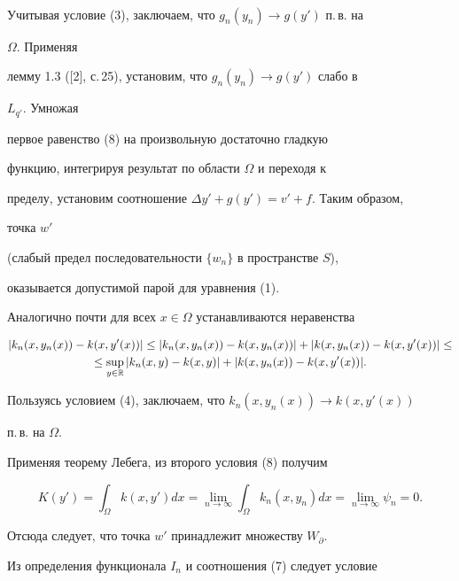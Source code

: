 \begin{pf}
\begin{gather*}
\end{gather*} 


Учитывая условие (3), заключаем, что $g_n(y_n)\to g(y')$ п.\,в. на 


$\Omega$. Применяя 


лемму 1.3 ([2], с.\,25), установим, что $g_n(y_n)\to g(y')$ слабо в 


$L_{q'}$. Умножая 


первое равенство (8) на произвольную достаточно гладкую 


функцию, интегрируя результат по области $\Omega$ и переходя к 


пределу, установим соотношение $\Delta y'+g(y')=v'+f$. Таким образом, 


точка $w'$ 


(слабый предел последовательности $\{w_n\}$ в пространстве $S$), 


оказывается допустимой парой для уравнения (1). 


 


Аналогично почти для всех $x\in\Omega$ устанавливаются неравенства 


\begin{gather*} 


|k_n(x,y_n(x))-k(x,y'(x))|\le|k_n(x,y_n(x))-k(x,y_n(x))|+ 


|k(x,y_n(x))-k(x,y'(x))|\le \\ 


% 


\le\sup_{y\in\Bbb R}|k_n(x,y)-k(x,y)|+ 


|k(x,y_n(x))-k(x,y'(x))|. 


\end{gather*} 


Пользуясь условием (4), заключаем, что $k_n(x,y_n(x))\to k(x,y'(x))$ 


п.\,в. на $\Omega$. 


Применяя теорему Лебега, из второго условия (8) получим 


$$ 


K(y')=\int_\Omega k(x,y')dx=\lim_{n\to\infty}\int_\Omega 


k_n(x,y_n)dx=\lim_{n\to\infty}\psi_n=0. 


$$ 


Отсюда следует, что точка $w'$ принадлежит множеству $W_\partial$. 


 


Из определения функционала $I_n$ и соотношения (7) следует условие 



\end{pf}

